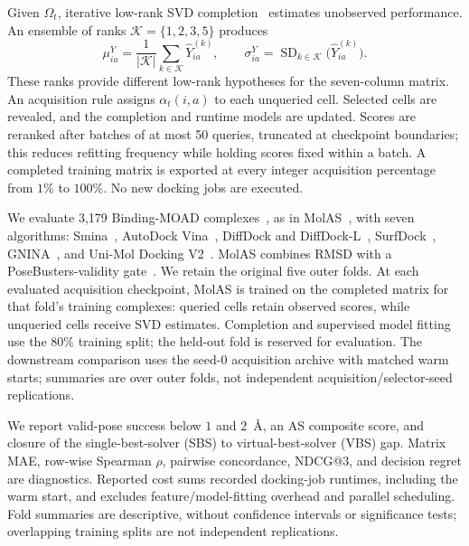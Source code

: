 \documentclass{article}
\begin{document}
Given $\Omega_t$, iterative low-rank SVD completion~\citep{mazumder2010spectral} estimates unobserved performance. An ensemble of ranks $\mathcal K=\{1,2,3,5\}$ produces
\begin{equation}
\mu^Y_{ia}=\frac{1}{|\mathcal K|}\sum_{k\in\mathcal K}\widehat Y^{(k)}_{ia},
\qquad
\sigma^Y_{ia}=\operatorname{SD}_{k\in\mathcal K}\bigl(\widehat Y^{(k)}_{ia}\bigr).
\end{equation}
These ranks provide different low-rank hypotheses for the seven-column matrix. An acquisition rule assigns $\alpha_t(i,a)$ to each unqueried cell. Selected cells are revealed, and the completion and runtime models are updated. Scores are reranked after batches of at most 50 queries, truncated at checkpoint boundaries; this reduces refitting frequency while holding scores fixed within a batch. A completed training matrix is exported at every integer acquisition percentage from $1\%$ to $100\%$. No new docking jobs are executed.

We evaluate 3,179 Binding-MOAD complexes~\citep{hu2005binding}, as in MolAS~\citep{wang2026molecular}, with seven algorithms: Smina~\citep{koes2013smina}, AutoDock Vina~\citep{trott2010vina}, DiffDock and DiffDock-L~\citep{corso2023diffdock,corso2024diffdockl}, SurfDock~\citep{cao2025surfdock}, GNINA~\citep{mcnutt2021gnina}, and Uni-Mol Docking V2~\citep{alcaide2025unimol}. MolAS combines RMSD with a PoseBusters-validity gate~\citep{buttenschoen2024posebusters}. We retain the original five outer folds. At each evaluated acquisition checkpoint, MolAS is trained on the completed matrix for that fold's training complexes: queried cells retain observed scores, while unqueried cells receive SVD estimates. Completion and supervised model fitting use the $80\%$ training split; the held-out fold is reserved for evaluation. The downstream comparison uses the seed-0 acquisition archive with matched warm starts; summaries are over outer folds, not independent acquisition/selector-seed replications.

We report valid-pose success below $1$ and $2$~\AA, an AS composite score, and closure of the single-best-solver (SBS) to virtual-best-solver (VBS) gap. Matrix MAE, row-wise Spearman $\rho$, pairwise concordance, NDCG@$3$, and decision regret are diagnostics. Reported cost sums recorded docking-job runtimes, including the warm start, and excludes feature/model-fitting overhead and parallel scheduling. Fold summaries are descriptive, without confidence intervals or significance tests; overlapping training splits are not independent replications.
\end{document}
